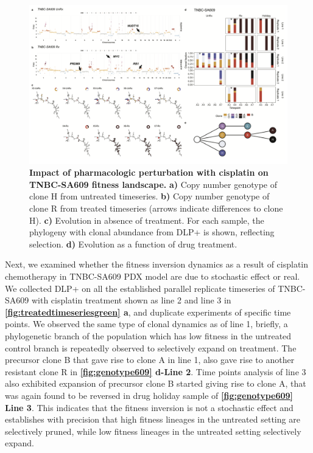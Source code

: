 \begin{figure}
\centering
\includegraphics[width=\textwidth]{Figures/chap4/genePlotSA609.png}
	
\caption[Impact of pharmacologic perturbation with cisplatin on TNBC-SA609 fitness landscape]
	{\small
	\textbf{Impact of pharmacologic perturbation with cisplatin on TNBC-SA609 fitness landscape.}
	 \textbf{a)} Copy number genotype of clone H from untreated timeseries. \textbf{b)} Copy number genotype of clone R from treated timeseries (arrows indicate differences to clone H). \textbf{c)}  Evolution in absence of treatment. For each sample, the phylogeny with clonal abundance from DLP+ is shown, reflecting selection. \textbf{d)} Evolution as a function of drug treatment.}
\label{fig:genotype609}
\end{figure}



Next, we examined whether the fitness inversion dynamics as a result of cisplatin chemotherapy in TNBC-SA609 PDX model are due to stochastic effect or real.
We collected DLP+ on all the established parallel replicate timeseries of TNBC-SA609 with cisplatin treatment shown as line 2 and line 3 in \textbf{\autoref{fig:treatedtimeseriesgreen} a}, and duplicate experiments of specific time points. We observed the same type of clonal dynamics as of line 1, briefly, a phylogenetic branch of the population which has low fitness in the untreated control branch is repeatedly observed to selectively expand on treatment. The precursor clone B that gave rise to clone A in line 1, also gave rise to another resistant clone R in \textbf{\autoref{fig:genotype609} d-Line 2}. Time points analysis of line 3 also exhibited expansion of precursor clone B started giving rise to clone A, that was again found to be reversed in drug holiday sample of \textbf{\autoref{fig:genotype609} Line 3}. This indicates that the fitness inversion is not a stochastic effect and establishes with precision that high fitness lineages in the untreated setting are selectively pruned, while low fitness lineages in the untreated setting selectively expand.


